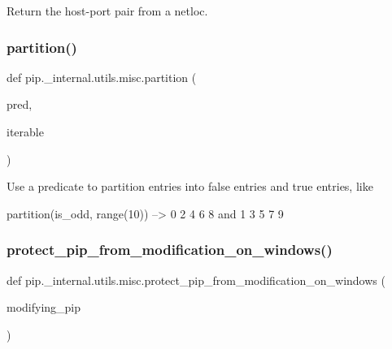 \begin{DoxyVerb}Return the host-port pair from a netloc.
\end{DoxyVerb}
 \mbox{\label{namespacepip_1_1__internal_1_1utils_1_1misc_ab1bf8a3147c51c323ea4ccb4fbb2156c}} 
\subsubsection{\texorpdfstring{partition()}{partition()}}
{\footnotesize\ttfamily def pip.\+\_\+internal.\+utils.\+misc.\+partition (\begin{DoxyParamCaption}\item[{}]{pred,  }\item[{}]{iterable }\end{DoxyParamCaption})}

\begin{DoxyVerb}Use a predicate to partition entries into false entries and true entries,
like

    partition(is_odd, range(10)) --> 0 2 4 6 8   and  1 3 5 7 9
\end{DoxyVerb}
 \mbox{\label{namespacepip_1_1__internal_1_1utils_1_1misc_aa77f1326dc7d585fd039d1316ecde3c7}} 
\subsubsection{\texorpdfstring{protect\+\_\+pip\+\_\+from\+\_\+modification\+\_\+on\+\_\+windows()}{protect\_pip\_from\_modification\_on\_windows()}}
{\footnotesize\ttfamily def pip.\+\_\+internal.\+utils.\+misc.\+protect\+\_\+pip\+\_\+from\+\_\+modification\+\_\+on\+\_\+windows (\begin{DoxyParamCaption}\item[{}]{modifying\+\_\+pip }\end{DoxyParamCaption})}

